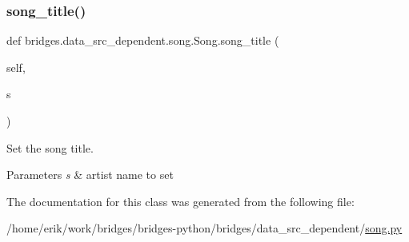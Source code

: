 \subsubsection{\texorpdfstring{song\+\_\+title()}{song\_title()}\hspace{0.1cm}{\footnotesize\ttfamily [2/2]}}
{\footnotesize\ttfamily def bridges.\+data\+\_\+src\+\_\+dependent.\+song.\+Song.\+song\+\_\+title (\begin{DoxyParamCaption}\item[{}]{self,  }\item[{}]{s }\end{DoxyParamCaption})}



Set the song title. 


\begin{DoxyParams}{Parameters}
{\em s} & artist name to set \\
\hline
\end{DoxyParams}


The documentation for this class was generated from the following file\+:\begin{DoxyCompactItemize}
\item 
/home/erik/work/bridges/bridges-\/python/bridges/data\+\_\+src\+\_\+dependent/\hyperlink{song_8py}{song.\+py}\end{DoxyCompactItemize}
